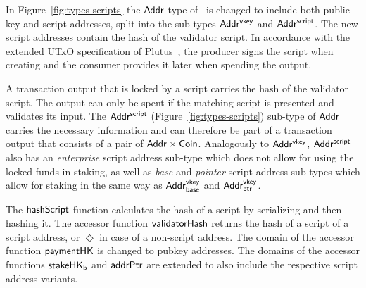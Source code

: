 \documentclass[11pt,a4paper,dvipsnames]{article}
\newcommand{\Nothing}{\ensuremath{\Diamond}}
\newcommand{\Addr}{\type{Addr}}
\newcommand{\AddrVKey}{\type{Addr^{vkey}}}
\newcommand{\Coin}{\type{Coin}}
\newcommand{\AddrVKeyB}{\type{Addr^{vkey}_{base}}}
\newcommand{\AddrVKeyP}{\type{Addr^{vkey}_{ptr}}}
\newcommand{\AddrScr}{\type{Addr^{script}}}
\theoremstyle{definition}
\begin{document}
In Figure~\ref{fig:types-scripts} the $\Addr$ type of~\cite{shelley_formal_spec}
is changed to include both public key and script addresses, split into the
sub-types $\AddrVKey$ and $\AddrScr$. The new script addresses contain the hash
of the validator script. In accordance with the extended UTxO specification of
Plutus~\cite{plutus_eutxo}, the producer signs the script when creating and the
consumer provides it later when spending the output.

A transaction output that is locked by a script carries the hash of the
validator script. The output can only be spent if the matching script is
presented and validates its input. The $\AddrScr$
(Figure~\ref{fig:types-scripts}) sub-type of $\Addr$ carries the necessary
information and can therefore be part of a transaction output that consists of a
pair of $\Addr\times\Coin$. Analogously to $\AddrVKey$, $\AddrScr$ also has an
\emph{enterprise} script address sub-type which does not allow for using the
locked funds in staking, as well as \emph{base} and \emph{pointer} script
address sub-types which allow for staking in the same way as $\AddrVKeyB$ and
$\AddrVKeyP$.

The $\mathsf{hashScript}$ function calculates the hash of a script by serializing
and then hashing it. The accessor function $\mathsf{validatorHash}$ returns the
hash of a script of a script address, or $\Nothing$ in case of a non-script
address. The domain of the accessor function $\mathsf{paymentHK}$ is changed to
pubkey addresses. The domains of the accessor functions $\mathsf{stakeHK_b}$ and
$\mathsf{addrPtr}$ are extended to also include the respective script address
variants.
\end{document}
